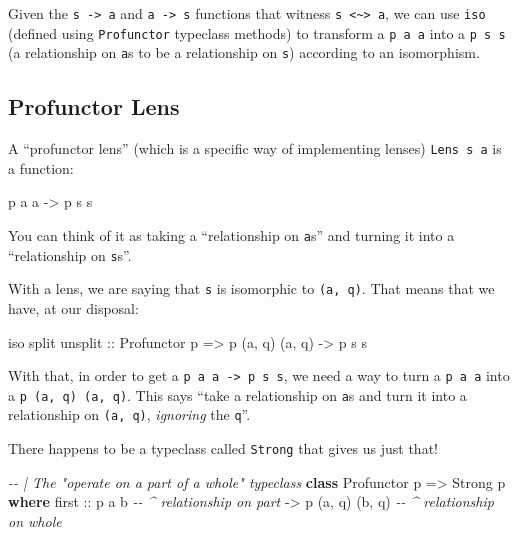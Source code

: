 \documentclass[]{article}
\newenvironment{Shaded}{}{}
\newcommand{\CommentTok}[1]{\textcolor[rgb]{0.38,0.63,0.69}{\textit{#1}}}
\newcommand{\DataTypeTok}[1]{\textcolor[rgb]{0.56,0.13,0.00}{#1}}
\newcommand{\KeywordTok}[1]{\textcolor[rgb]{0.00,0.44,0.13}{\textbf{#1}}}
\newcommand{\NormalTok}[1]{#1}
\newcommand{\OtherTok}[1]{\textcolor[rgb]{0.00,0.44,0.13}{#1}}
\begin{document}
Given the \texttt{s\ -\textgreater{}\ a} and \texttt{a\ -\textgreater{}\ s}
functions that witness
\texttt{s\ \textless{}\textasciitilde{}\textgreater{}\ a}, we can use
\texttt{iso} (defined using \texttt{Profunctor} typeclass methods) to transform
a \texttt{p\ a\ a} into a \texttt{p\ s\ s} (a relationship on \texttt{a}s to be
a relationship on \texttt{s}) according to an isomorphism.

\hypertarget{profunctor-lens}{%
\subsection{Profunctor Lens}\label{profunctor-lens}}

A ``profunctor lens'' (which is a specific way of implementing lenses)
\texttt{Lens\textquotesingle{}\ s\ a} is a function:

\begin{Shaded}
\begin{Highlighting}[]
\NormalTok{p a a }\OtherTok{{-}>}\NormalTok{ p s s}
\end{Highlighting}
\end{Shaded}

You can think of it as taking a ``relationship on \texttt{a}s'' and turning it
into a ``relationship on \texttt{s}s''.

With a lens, we are saying that \texttt{s} is isomorphic to \texttt{(a,\ q)}.
That means that we have, at our disposal:

\begin{Shaded}
\begin{Highlighting}[]
\NormalTok{iso split unsplit}
\OtherTok{    ::} \DataTypeTok{Profunctor}\NormalTok{ p}
    \OtherTok{=>}\NormalTok{ p (a, q) (a, q)}
    \OtherTok{{-}>}\NormalTok{ p s s}
\end{Highlighting}
\end{Shaded}

With that, in order to get a \texttt{p\ a\ a\ -\textgreater{}\ p\ s\ s}, we need
a way to turn a \texttt{p\ a\ a} into a \texttt{p\ (a,\ q)\ (a,\ q)}. This says
``take a relationship on \texttt{a}s and turn it into a relationship on
\texttt{(a,\ q)}, \emph{ignoring} the \texttt{q}''.

There happens to be a typeclass called \texttt{Strong} that gives us just that!

\begin{Shaded}
\begin{Highlighting}[]
\CommentTok{{-}{-} | The "operate on a part of a whole" typeclass}
\KeywordTok{class} \DataTypeTok{Profunctor}\NormalTok{ p }\OtherTok{=>} \DataTypeTok{Strong}\NormalTok{ p }\KeywordTok{where}
\NormalTok{    first\textquotesingle{}}
\OtherTok{        ::}\NormalTok{ p a b                }\CommentTok{{-}{-} \^{} relationship on part}
        \OtherTok{{-}>}\NormalTok{ p (a, q) (b, q)      }\CommentTok{{-}{-} \^{} relationship on whole}
\end{Highlighting}
\end{Shaded}
\end{document}
